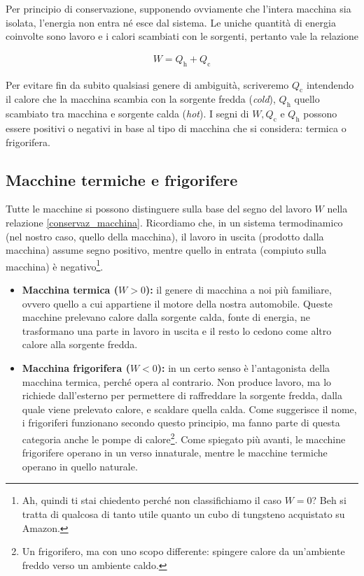 Per principio di conservazione, supponendo
ovviamente che l'intera macchina sia isolata, l'energia
non entra né esce dal sistema. Le uniche quantità di energia
coinvolte sono lavoro e i calori scambiati con le sorgenti,
pertanto vale la relazione

\begin{align}
    W = Q_\text{h} + Q_\text{c}\label{conservaz_macchina}
\end{align}

\noindent Per evitare fin da subito qualsiasi genere di
ambiguità, scriveremo $Q_\text{c}$ intendendo il calore che
la macchina scambia con la sorgente fredda (\textit{cold}),
$Q_\text{h}$ quello scambiato tra macchina e sorgente calda
(\textit{hot}). I segni di $W, Q_\text{c}$ e $Q_\text{h}$
possono essere positivi o negativi in base al tipo di
macchina che si considera: termica o frigorifera.

\subsection{Macchine termiche e frigorifere}
Tutte le macchine si possono distinguere sulla base del segno
del lavoro $W$ nella relazione \ref{conservaz_macchina}. Ricordiamo
che, in un sistema termodinamico (nel nostro caso, quello della
macchina), il lavoro in uscita (prodotto dalla macchina) assume
segno positivo, mentre quello in entrata (compiuto sulla macchina)
è negativo\footnote{Ah, quindi ti stai chiedento perché non classifichiamo
il caso $W = 0$? Beh si tratta di qualcosa di tanto utile quanto un
cubo di tungsteno acquistato su Amazon.}.

\begin{itemize}
    \item \textbf{Macchina termica ($W > 0$):} il genere di macchina a noi
    più familiare, ovvero quello a cui appartiene il motore della
    nostra automobile. Queste macchine prelevano calore dalla sorgente
    calda, fonte di energia, ne trasformano una parte in lavoro in uscita
    e il resto lo cedono come altro calore alla sorgente fredda.

    \item \textbf{Macchina frigorifera ($W < 0$):} in un certo senso
    è l'antagonista della macchina termica, perché opera al contrario.
    Non produce lavoro, ma lo richiede dall'esterno per permettere di
    raffreddare la sorgente fredda, dalla quale viene prelevato calore,
    e scaldare quella calda. Come suggerisce il nome, i frigoriferi
    funzionano secondo questo principio, ma fanno parte di questa
    categoria anche le
    pompe di calore\footnote{Un frigorifero, ma con uno
    scopo differente: spingere calore da un'ambiente freddo verso
    un ambiente caldo.}. Come spiegato più avanti, le macchine frigorifere
    operano in un verso innaturale, mentre le macchine termiche operano in
    quello naturale.
\end{itemize}


